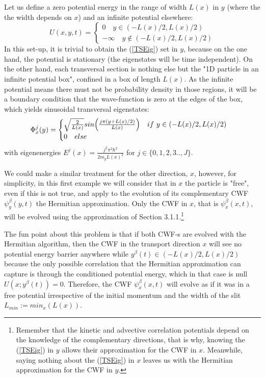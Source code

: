 \documentclass[11pt, a4paper]{article} %
\begin{document}
Let us define a zero potential energy in the range of width $L(x)$ in $y$ (where the the width depends on $x$) and an infinite potential elsewhere:
$$
U(x,y,t)=\begin{cases}
0\quad  y\in (-L(x)/2, L(x)/2)\\
-\infty\quad y\notin (-L(x)/2, L(x)/2)
\end{cases}
$$
In this set-up, it is trivial to obtain the (\ref{TSEig}) set in $y$, because on the one hand, the potential is stationary (the eigenstates will be time independent). On the other hand, each transversal section is nothing else but the "1D particle in an infinite potential box", confined in a box of length $L(x)$. As the infinite potential means there must not be probability density in those regions, it will be a boundary condition that the wave-function is zero at the edges of the box, which yields sinusoidal transversal eigenstates:
$$
\Phi^j_{x}(y)=\begin{cases} \sqrt{\frac{2}{L(x)}}sin\qty( \frac{j\pi (y+L(x)/2)}{L(x)} )\quad if\ y\in(-L(x)/2, L(x)/2)\\0\quad else\end{cases}
$$ 
with eigenenergies $E^j(x)=\frac{j^2\pi^2 \hbar^2}{2m_y L(x)^2}$ for $j \in\{0,1,2,3..,J\}$.

We could make a similar treatment for the other direction, $x$, however, for simplicity, in this first example we will consider that in $x$ the particle is "free", even if this is not true, and apply to the evolution of its complementary CWF $\psi^\beta_y(y,t)$ the Hermitian approximation. Only the CWF in $x$, that is $\psi^\beta_x(x,t)$, will be evolved using the approximation of Section 3.1.1.\footnote{Remember that the kinetic and advective correlation potentials depend on the knowledge of the complementary directions, that is why, knowing the (\ref{TSEig}) in $y$ allows their approximation for the CWF in $x$. Meanwhile, saying nothing about the (\ref{TSEig}) in $x$ leaves us with the Hermitian approximation for the CWF in $y$.}

The fun point about this problem is that if both CWF-s are evolved with the Hermitian algorithm, then the CWF in the transport direction $x$ will see no potential energy barrier anywhere while $y^\beta(t)\in(-L(x)/2,L(x)/2)$ because the only possible correlation that the Hermitian approximation can capture is through the conditioned potential energy, which in that case is null $U(x;y^\beta(t))=0$. Therefore, the CWF $\psi^\beta_x(x,t)$ will evolve as if it was in a free potential irrespective of the initial momentum and the width of the slit $L_{min}:=min_x(L(x))$.
\end{document}

